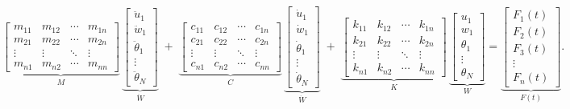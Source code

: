 \documentclass{article}
\begin{document}
	\begin{equation}\label{eq:global_expanded}
		\underbrace{\begin{bmatrix}
				m_{11} & m_{12} & \cdots & m_{1n}\\
				m_{21} & m_{22} & \cdots & m_{2n}\\
				\vdots & \vdots & \ddots & \vdots\\
				m_{n1} & m_{n2} & \cdots & m_{nn}
		\end{bmatrix}}_{M}
		\,
		\underbrace{\begin{bmatrix}
				\ddot u_1\\[4pt]
				\ddot w_1\\[4pt]
				\ddot \theta_1 \\[2pt]
				\vdots \\[2pt]
				\ddot \theta_N
		\end{bmatrix}}_{\ddot W}
		\;+\;
		\underbrace{\begin{bmatrix}
				c_{11} & c_{12} & \cdots & c_{1n}\\
				c_{21} & c_{22} & \cdots & c_{2n}\\
				\vdots & \vdots & \ddots & \vdots\\
				c_{n1} & c_{n2} & \cdots & c_{nn}
		\end{bmatrix}}_{C}
		\,
		\underbrace{\begin{bmatrix}
				\dot u_1\\[4pt]
				\dot w_1\\[4pt]
				\dot \theta_1 \\[2pt]
				\vdots \\[2pt]
				\dot \theta_N
		\end{bmatrix}}_{\dot W}
		\;+\;
		\underbrace{\begin{bmatrix}
				k_{11} & k_{12} & \cdots & k_{1n}\\
				k_{21} & k_{22} & \cdots & k_{2n}\\
				\vdots & \vdots & \ddots & \vdots\\
				k_{n1} & k_{n2} & \cdots & k_{nn}
		\end{bmatrix}}_{K}
		\,
		\underbrace{\begin{bmatrix}
				u_1\\[4pt]
				w_1\\[4pt]
				\theta_1 \\[2pt]
				\vdots \\[2pt]
				\theta_N
		\end{bmatrix}}_{W}
		=
		\underbrace{\begin{bmatrix}
				F_1(t)\\[4pt]
				F_2(t)\\[4pt]
				F_3(t) \\[2pt]
				\vdots \\[2pt]
				F_n(t)
		\end{bmatrix}}_{F(t)}.
	\end{equation}
	
\end{document}
